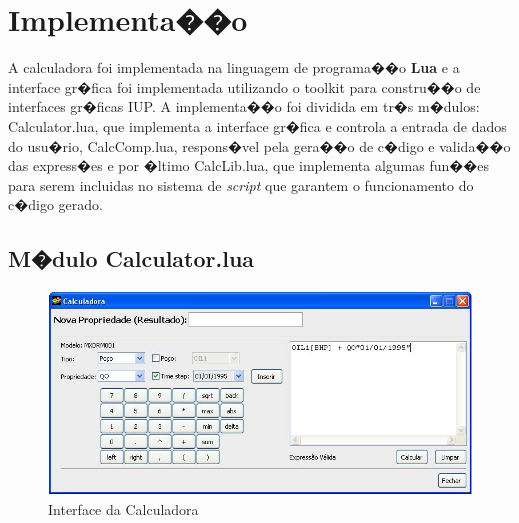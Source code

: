 \documentclass[dissertacao,modelo1,brazil]{ThesisPUC}
\newcommand{\script}{\emph{script}}
\begin{document}
\section{Implementa��o}

A calculadora foi implementada na linguagem de programa��o \textbf{Lua} e a interface gr�fica
foi implementada utilizando o toolkit para constru��o de interfaces gr�ficas IUP.
\cite{IUP}
A implementa��o foi dividida em tr�s m�dulos: Calculator.lua, que implementa a interface
gr�fica e controla a entrada de dados do usu�rio, CalcComp.lua, respons�vel pela gera��o
de c�digo e valida��o das express�es e por �ltimo CalcLib.lua, que implementa algumas fun��es para
serem incluidas no sistema de \script{} que garantem o funcionamento do c�digo gerado.

\subsection{M�dulo Calculator.lua}

    \begin{figure}[!htb]
      \centering
      \includegraphics[bb= 0 0 534 257,width=\textwidth]{calc1.JPG}
      \caption{Interface da Calculadora}
      \label{interface}
    \end{figure}
\end{document}

